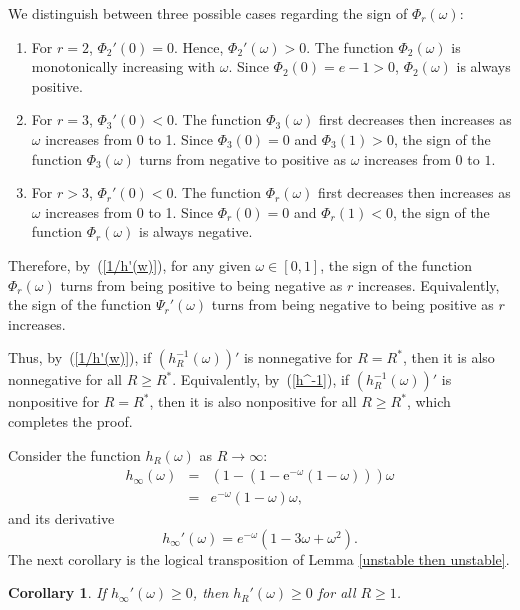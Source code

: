 \documentclass{IEEEtran}
\newtheorem{corollary}{Corollary}
\begin{document}
\begin{IEEEproof}
We distinguish between three possible cases regarding the sign of $\Phi_r(\omega)$:
\begin{enumerate}
	\item For $r=2$, $\Phi_2'(0)=0$. Hence, $\Phi_2'(\omega)>0$. The function $\Phi_2(\omega)$ is monotonically increasing with $\omega$. Since
$\Phi_2(0)=e-1>0$, $\Phi_2(\omega)$ is always positive.
	\item For $r=3$, $\Phi_3'(0)<0$. The function $\Phi_3(\omega)$ first decreases then increases as $\omega$ increases from 0 to 1. Since
$\Phi_3(0)=0$ and $\Phi_3(1)>0$, the sign of the function $\Phi_3(\omega)$ turns from negative to positive as $\omega$ increases from $0$ to $1$.
	\item For $r>3$, $\Phi_r'(0)<0$. The function $\Phi_r(\omega)$ first decreases then increases as $\omega$ increases from 0 to 1. Since
$\Phi_r(0)=0$ and $\Phi_r(1)<0$, the sign of the function $\Phi_r(\omega)$ is always negative.
\end{enumerate}

Therefore, by~(\ref{1/h'(w)}), for any given $\omega \in [0,1]$, the sign of the function $\Phi_r(\omega)$ turns from being positive to being
negative as $r$ increases. Equivalently, the sign of the function $\Psi_r'(\omega)$ turns from being negative to being positive as $r$ increases.

Thus, by~(\ref{1/h'(w)}), if $\left(h_{R}^{-1}(\omega)\right)'$ is nonnegative for $R=R^*$, then it is also nonnegative for all $R \geq R^*$.
Equivalently, by~(\ref{h^-1}), if $\left(h_R^{-1}(\omega)\right)'$ is nonpositive for $R=R^*$, then it is also nonpositive for all $R \geq R^*$,
which completes the proof.
\end{IEEEproof}

Consider the function $h_R(\omega)$ as $R\rightarrow\infty$:
\begin{eqnarray} \label{lim R infty h_R}
h_\infty(\omega) & = & (1-\left(1 - \mathrm{e}^{-\omega}(1-\omega)\right))\omega \nonumber\\
& = & e^{-\omega}(1-\omega)\omega,
\end{eqnarray}
and its derivative
\begin{equation} \label{lim R infty h_R'}
h_\infty'(\omega) =  e^{-\omega}(1-3\omega+\omega^2).
\end{equation}
The next corollary is the logical transposition of Lemma \ref{unstable then unstable}.
\begin{corollary} \label{stability when R infty}
If $h_{\infty}'(\omega) \geq 0$, then $h_R'(\omega) \geq 0$ for all $R \geq 1$.
\end{corollary}
\end{document}
